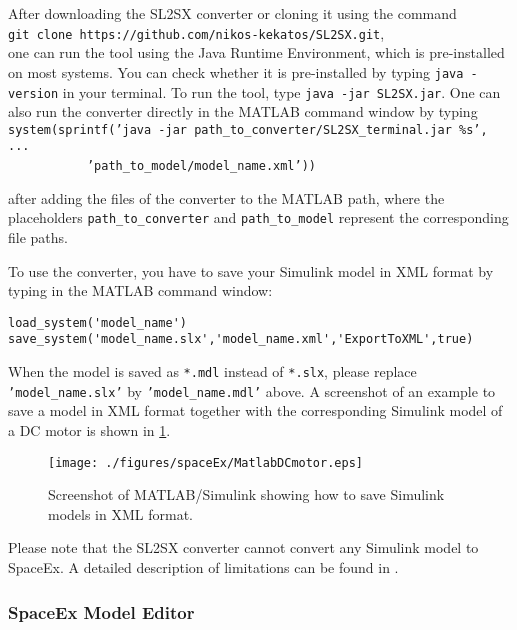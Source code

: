 After downloading the SL2SX converter or cloning it using the command \\[0.3cm]
\texttt{git clone https://github.com/nikos-kekatos/SL2SX.git}, \\[0.3cm]
one can run the tool using the Java Runtime Environment, which is pre-installed on most systems. You can check whether it is pre-installed by typing \texttt{java -version} in your terminal. To run the tool, type \texttt{java -jar SL2SX.jar}. One can also run the converter directly in the MATLAB command window by typing \\[0.3cm]
\texttt{system(sprintf('java -jar path\_to\_converter/SL2SX\_terminal.jar \%s', ...}\\
$~~~~~~~~~~~~~~~~~~~~~~~~$ \texttt{'path\_to\_model/model\_name.xml'))} \\[0.3cm]
{\raggedright
after adding the files of the converter to the MATLAB path, where the placeholders \texttt{path\_to\_converter} and \texttt{path\_to\_model} represent the corresponding file paths.
\par}

To use the converter, you have to save your Simulink model in XML format by typing in the MATLAB command window:
\begin{verbatim}
load_system('model_name') 
save_system('model_name.slx','model_name.xml','ExportToXML',true) 
\end{verbatim}
When the model is saved as \texttt{*.mdl} instead of \texttt{*.slx}, please replace \texttt{'model\_name.slx'} by \texttt{'model\_name.mdl'} above. A screenshot of an example to save a model in XML format together with the corresponding Simulink model of a DC motor is shown in \cref{fig:MatlabDCmotor}.

\begin{figure}[htb]
  \centering									 
    \texttt{[image: ./figures/spaceEx/MatlabDCmotor.eps]}
    \caption{Screenshot of MATLAB/Simulink showing how to save Simulink models in XML format.}
    \label{fig:MatlabDCmotor}		
\end{figure}

Please note that the SL2SX converter cannot convert any Simulink model to SpaceEx. A detailed description of limitations can be found in \cite{Minopoli2016,Kekatos2017}.


\subsubsection{SpaceEx Model Editor} \label{sec:spaceexModelEditor}

